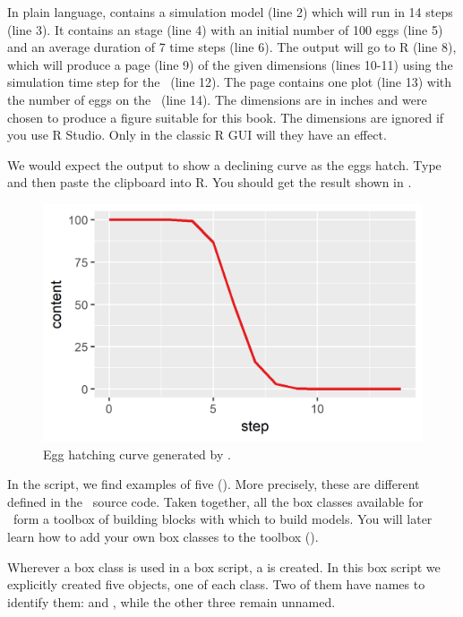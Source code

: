 In plain language,  contains a simulation model (line 2) which will run in 14 steps (line 3). It contains an  stage (line 4) with an initial number of 100 eggs (line 5) and an average duration of 7 time steps (line 6). The output will go to R (line 8), which will produce a page (line 9) of the given dimensions (lines 10-11) using the simulation time step for the \xaxis\ (line 12). The page contains one plot (line 13) with the number of eggs on the \yaxis\ (line 14). The dimensions are in inches and were chosen to produce a figure suitable for this book. The dimensions are ignored if you use R Studio. Only in the classic R GUI will they have an effect.

We would expect the output to show a declining curve as the eggs hatch. Type  and then paste the clipboard into R. You should get the result shown in .

\begin{figure} [b]
\centering
\includegraphics{graphics/egg1}
\caption{Egg hatching curve generated by .}
\label{fig:egg1}
\end{figure}

In the  script, we find examples of five  (). More precisely, these are different  defined in the \CPP\ source code. Taken together, all the box classes available for \US\ form a toolbox of building blocks with which to build models. You will later learn how to add your own box classes to the toolbox ().

Wherever a box class is used in a box script, a  is created. In this box script we explicitly created five objects, one of each class. Two of them have names to identify them:  and , while the other three remain unnamed. 

